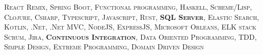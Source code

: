 
{\fontsize{8pt}{1em}\bodyfont\scshape\color{graytext}
 React Remix, Spring Boot, Functional programming, Haskell, Scheme/Lisp, Clojure, Csharp, Typescript, Javascript, Rust, \textbf{SQL Server}, Elastic Search, Kotlin, .Net, .Net MVC, NodeJS, ExpressJS, Microsoft Orleans, ELK stack Scrum, Jira, \textbf{Continuous Integration}, Data Oriented Programming, TDD, Simple Design, Extreme Programming, Domain Driven Design
}

